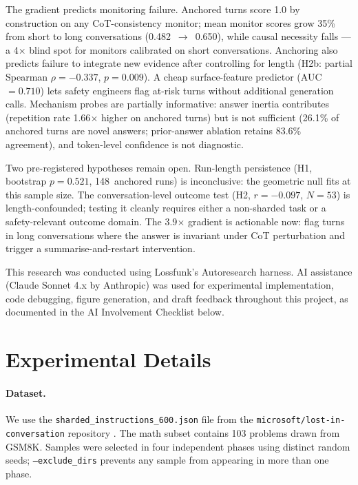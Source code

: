 \documentclass{article}
\begin{document}
The gradient predicts monitoring failure.
Anchored turns score 1.0 by construction on any CoT-consistency
monitor; mean monitor scores grow 35\% from short to long
conversations (0.482~$\to$~0.650), while causal necessity falls
--- a 4$\times$ blind spot for monitors calibrated on short
conversations.
Anchoring also predicts failure to integrate new evidence after
controlling for length (H2b: partial Spearman $\rho=-0.337$,
$p=0.009$).
A cheap surface-feature predictor (AUC~$=0.710$) lets safety
engineers flag at-risk turns without additional generation calls.
Mechanism probes are partially informative: answer inertia
contributes (repetition rate 1.66$\times$ higher on anchored turns)
but is not sufficient (26.1\% of anchored turns are novel answers;
prior-answer ablation retains 83.6\% agreement), and token-level
confidence is not diagnostic.

Two pre-registered hypotheses remain open.
Run-length persistence (H1, bootstrap $p=0.521$, 148~anchored
runs) is inconclusive: the geometric null fits at this sample size.
The conversation-level outcome test (H2, $r=-0.097$, $N=53$) is
length-confounded; testing it cleanly requires either a non-sharded
task or a safety-relevant outcome domain.
The 3.9$\times$ gradient is actionable now: flag turns in long
conversations where the answer is invariant under CoT perturbation
and trigger a summarise-and-restart intervention.

\begin{ack}
This research was conducted using Lossfunk's Autoresearch harness.
AI assistance (Claude Sonnet 4.x by Anthropic) was used for
experimental implementation, code debugging, figure generation,
and draft feedback throughout this project, as documented in the
AI Involvement Checklist below.
\end{ack}




\appendix
\section{Experimental Details}
\label{app:details}

\paragraph{Dataset.}
We use the \texttt{sharded\_instructions\_600.json} file from the
\texttt{microsoft/lost-in-conversation} repository \citep{lost_in_conversation_repo}.
The math subset contains 103 problems drawn from GSM8K.
Samples were selected in four independent phases using distinct
random seeds; \texttt{--exclude\_dirs} prevents any sample from
appearing in more than one phase.
\end{document}
